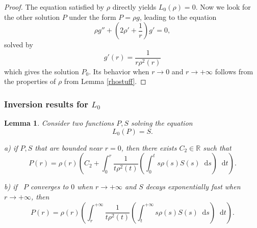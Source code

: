 \documentclass[11 pt]{amsart}
\newtheorem{lem}{Lemma}[section]
\theoremstyle{definition}
\theoremstyle{remark}
\numberwithin{equation}{section}
\newcommand{\dd}{\mathop{}\!\mathrm{d}}
\begin{document}
\begin{proof}
  The equation satisfied by $\rho$ directly yields $L_0 (\rho) = 0$. Now we
  look for the other solution $P$ under the form $P = \rho g$, leading to the
  equation
  \[ \rho g'' + \left( 2 \rho' + \frac{1}{r} \right) g' = 0, \]
  solved by
  \[ g' (r) = \frac{1}{r \rho^2 (r)} \]
  which gives the solution $P_0$. Its behavior when $r \rightarrow 0$ and $r
  \rightarrow + \infty$ follows from the properties of $\rho$ from Lemma
  \ref{rhostuff}.
\end{proof}

\subsubsection{Inversion results for $L_0$}

\begin{lem}
  \label{L0}Consider two functions $P, S$ solving the equation
  \[ L_0 (P) = S. \]
  
  
  a) if $P, S$ that are bounded near $r = 0$, then there exists $C_2 \in
  \mathbb{R}$ such that
  \[ P (r) = \rho (r) \left( C_2 + \int_0^r \frac{1}{t \rho^2 (t)} \left(
     \int_0^t s \rho (s) S (s)\dd s\right)\dd t  \right) . \]
  
  
  b) if \ $P$ converges to $0$ when $r \rightarrow + \infty$ and $S$ decays
  exponentially fast when $r \rightarrow + \infty$, then
  \[ P (r) = \rho (r) \left( \int_r^{+ \infty} \frac{1}{t \rho^2 (t)} \left(
     \int_t^{+ \infty} s \rho (s) S (s)\dd s\right)\dd t  \right) . \]
\end{lem}
\end{document}
